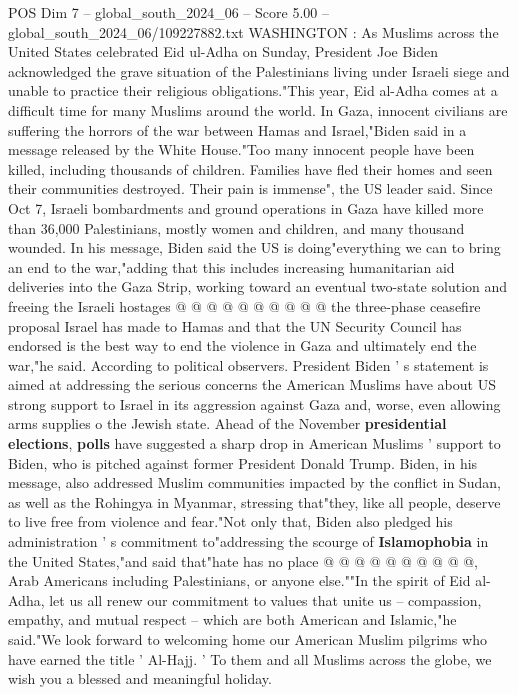 \begin{textsample}{POS Dim 7 – global\_south\_2024\_06 – Score 5.00 – global\_south\_2024\_06/109227882.txt}  \label{ex:f7_pos_243}
WASHINGTON : As Muslims across the United States celebrated Eid ul-Adha on Sunday, President Joe Biden acknowledged the grave situation of the Palestinians living under Israeli siege and unable to practice their religious obligations."This year, Eid al-Adha comes at a difficult time for many Muslims around the world.
In Gaza, innocent civilians are suffering the horrors of the war between Hamas and Israel,"Biden said in a message released by the White House."Too many innocent people have been killed, including thousands of children.
Families have fled their homes and seen their communities destroyed.
Their pain is immense", the US leader said.
Since Oct 7, Israeli bombardments and ground operations in Gaza have killed more than 36,000 Palestinians, mostly women and children, and many thousand wounded.
In his message, Biden said the US is doing"everything we can to bring an end to the war,"adding that this includes increasing humanitarian aid deliveries into the Gaza Strip, working toward an eventual two-state solution and freeing the Israeli hostages @ @ @ @ @ @ @ @ @ @ the three-phase ceasefire proposal Israel has made to Hamas and that the UN Security Council has endorsed is the best way to end the violence in Gaza and ultimately end the war,"he said.
According to political observers.
President Biden ' s statement is aimed at addressing the serious concerns the American Muslims have about US strong support to Israel in its aggression against Gaza and, worse, even allowing arms supplies o the Jewish state.
Ahead of the November \textbf{presidential} \textbf{elections}, \textbf{polls} have suggested a sharp drop in American Muslims ' support to Biden, who is pitched against former President Donald Trump.
Biden, in his message, also addressed Muslim communities impacted by the conflict in Sudan, as well as the Rohingya in Myanmar, stressing that"they, like all people, deserve to live free from violence and fear."Not only that, Biden also pledged his administration ' s commitment to"addressing the scourge of \textbf{Islamophobia} in the United States,"and said that"hate has no place @ @ @ @ @ @ @ @ @ @, Arab Americans including Palestinians, or anyone else.""In the spirit of Eid al-Adha, let us all renew our commitment to values that unite us -- compassion, empathy, and mutual respect -- which are both American and Islamic,"he said."We look forward to welcoming home our American Muslim pilgrims who have earned the title ' Al-Hajj. ' To them and all Muslims across the globe, we wish you a blessed and meaningful holiday.

\end{textsample}
